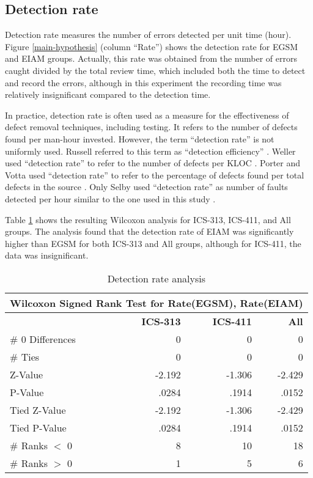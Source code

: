 \subsection {Detection rate}

Detection rate measures the number of errors detected per unit time
(hour). Figure \ref{main-hypothesis} (column ``Rate'') shows the 
detection rate  for EGSM and EIAM groups. Actually, this rate was
obtained from the number of errors caught divided by the
total review time, which included both the time to detect
and record the errors, although in this experiment the recording time was
relatively insignificant compared to the detection time.

In practice, detection rate is often used as a measure for the
effectiveness of defect removal techniques, including testing. It
refers to the number of defects found per man-hour invested. 
However, the term ``detection rate'' is not uniformly used.
Russell referred to this term as ``detection efficiency''
\cite{Russell91}.  Weller used ``detection rate'' to refer to the
number of defects per KLOC \cite{Weller93}. Porter and Votta  used  
``detection rate'' to refer to the percentage of defects found
per total defects in the source \cite{Porter94}. %
Only Selby used ``detection rate'' as number of faults detected per
hour similar to the one used in this study \cite{Selby85}.

Table \ref{detection-rate-analysis} shows the resulting Wilcoxon
analysis for ICS-313, ICS-411, and All groups.
The analysis found that the detection rate of EIAM was
significantly higher than EGSM for both ICS-313
and All groups, although for ICS-411, the data was insignificant.

\begin{table}[htb]
 \caption{Detection rate analysis}
 \begin{center}
 \begin{tabular}{|l|r|r|r|}
  \hline
  \multicolumn{4}{|c|}{\bf Wilcoxon Signed Rank Test for Rate(EGSM), Rate(EIAM)}\\
  \hline
  & {\bf ICS-313} & {\bf ICS-411} & {\bf All} \\ 
  \hline
  \# 0 Differences & 0      & 0 & 0\\
  \# Ties          & 0      & 0 & 0\\
  Z-Value          & -2.192 & -1.306 & -2.429\\
  P-Value          & .0284  & .1914 & .0152\\
  Tied Z-Value     & -2.192 & -1.306 & -2.429\\
  Tied P-Value     & .0284  & .1914 & .0152\\
  \# Ranks $<$ 0   & 8      & 10 & 18\\
  \# Ranks $>$ 0   & 1      & 5 & 6\\
  \hline
     \end{tabular}
  \end{center}
  \label{detection-rate-analysis}
\end{table} 



